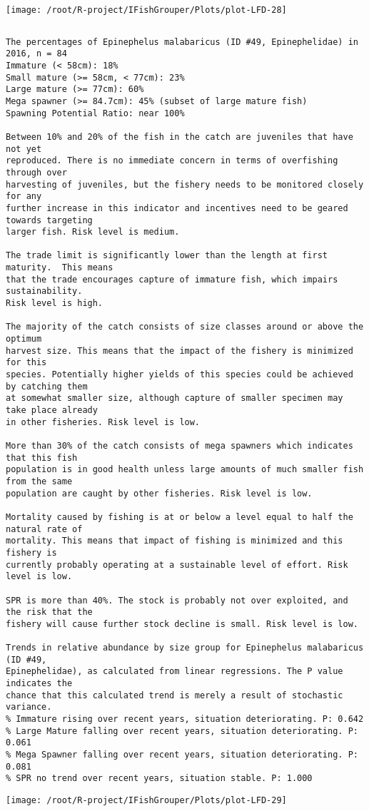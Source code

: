\documentclass{report}\usepackage[]{graphicx}\usepackage[]{color}
\makeatletter
\def\maxwidth{ %
  \ifdim\Gin@nat@width>\linewidth
    \linewidth
  \else
    \Gin@nat@width
  \fi
}
\newenvironment{kframe}{%
 \def\at@end@of@kframe{}%
 \ifinner\ifhmode%
  \def\at@end@of@kframe{\end{minipage}}%
  \begin{minipage}{\columnwidth}%
 \fi\fi%
 \def\FrameCommand##1{\hskip\@totalleftmargin \hskip-\fboxsep
 \colorbox{shadecolor}{##1}\hskip-\fboxsep
     \hskip-\linewidth \hskip-\@totalleftmargin \hskip\columnwidth}%
 \MakeFramed {\advance\hsize-\width
   \@totalleftmargin\z@ \linewidth\hsize
   \@setminipage}}%
 {\par\unskip\endMakeFramed%
 \at@end@of@kframe}
\newenvironment{knitrout}{}{} %
\makeatother
\begin{document}
\begin{knitrout}
\texttt{[image: /root/R-project/IFishGrouper/Plots/plot-LFD-28]} 
\begin{kframe}\begin{verbatim}
\end{verbatim}
\end{kframe}
\clearpage
\newpage
\begin{kframe}\begin{verbatim}The percentages of Epinephelus malabaricus (ID #49, Epinephelidae) in 2016, n = 84
Immature (< 58cm): 18%
Small mature (>= 58cm, < 77cm): 23%
Large mature (>= 77cm): 60%
Mega spawner (>= 84.7cm): 45% (subset of large mature fish)
Spawning Potential Ratio: near 100%
 
Between 10% and 20% of the fish in the catch are juveniles that have not yet
reproduced. There is no immediate concern in terms of overfishing through over
harvesting of juveniles, but the fishery needs to be monitored closely for any
further increase in this indicator and incentives need to be geared towards targeting
larger fish. Risk level is medium.

The trade limit is significantly lower than the length at first maturity.  This means
that the trade encourages capture of immature fish, which impairs sustainability.
Risk level is high.

The majority of the catch consists of size classes around or above the optimum
harvest size. This means that the impact of the fishery is minimized for this
species. Potentially higher yields of this species could be achieved by catching them
at somewhat smaller size, although capture of smaller specimen may take place already
in other fisheries. Risk level is low.

More than 30% of the catch consists of mega spawners which indicates that this fish
population is in good health unless large amounts of much smaller fish from the same
population are caught by other fisheries. Risk level is low.
 
Mortality caused by fishing is at or below a level equal to half the natural rate of
mortality. This means that impact of fishing is minimized and this fishery is
currently probably operating at a sustainable level of effort. Risk level is low.
 
SPR is more than 40%. The stock is probably not over exploited, and the risk that the
fishery will cause further stock decline is small. Risk level is low.
 
Trends in relative abundance by size group for Epinephelus malabaricus (ID #49,
Epinephelidae), as calculated from linear regressions. The P value indicates the
chance that this calculated trend is merely a result of stochastic variance.
% Immature rising over recent years, situation deteriorating. P: 0.642
% Large Mature falling over recent years, situation deteriorating. P: 0.061
% Mega Spawner falling over recent years, situation deteriorating. P: 0.081
% SPR no trend over recent years, situation stable. P: 1.000
\end{verbatim}
\end{kframe}
\texttt{[image: /root/R-project/IFishGrouper/Plots/plot-LFD-29]} 


\end{knitrout}
\end{document}
